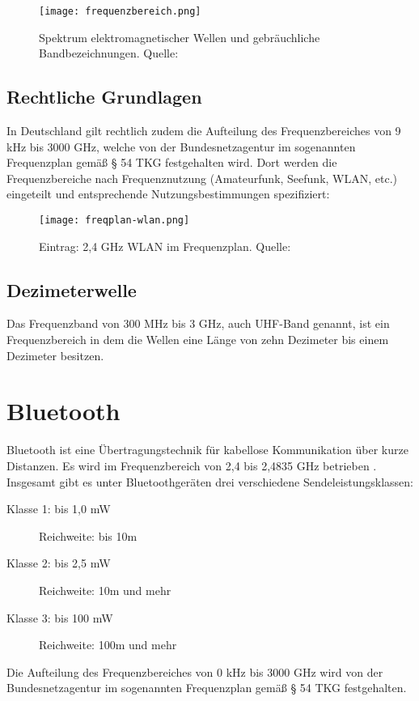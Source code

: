 \begin{figure}[ht]
	\centering
	\texttt{[image: frequenzbereich.png]}
	\caption[Spektrum elektromagnetischer Wellen und gebräuchliche Bandbezeichnungen]{Spektrum elektromagnetischer Wellen und gebräuchliche Bandbezeichnungen. Quelle: \cite[Kark, S. 1]{Kark:2017}} 
	\label{frequenzbereiche}
\end{figure}


\subsection{Rechtliche Grundlagen} %
In Deutschland gilt rechtlich zudem die Aufteilung des Frequenzbereiches von 9 kHz bis 3000 GHz, welche von der Bundesnetzagentur im sogenannten Frequenzplan \cite[Bundesnetzagentur, 2016]{bundesnetzagentur-frequenzplan:2016} gemäß § 54 TKG festgehalten wird.
Dort werden die Frequenzbereiche nach Frequenznutzung (Amateurfunk, Seefunk, WLAN, etc.) eingeteilt und entsprechende Nutzungsbestimmungen spezifiziert:

\begin{figure}[ht]
	\centering
	\texttt{[image: freqplan-wlan.png]}
	\caption[Eintrag: 2,4 GHz WLAN im Frequenzplan]{Eintrag: 2,4 GHz WLAN im Frequenzplan. Quelle: \cite[Bundesnetzagentur, 2016]{bundesnetzagentur-frequenzplan:2016}}
	\label{frequenzplan-wlan}
\end{figure}

\subsection{Dezimeterwelle}
Das Frequenzband von 300 MHz bis 3 GHz, auch \ac{UHF}-Band genannt, ist ein Frequenzbereich in dem die Wellen eine Länge von zehn Dezimeter bis einem Dezimeter besitzen.

\section{Bluetooth}
Bluetooth ist eine Übertragungstechnik für kabellose Kommunikation über kurze Distanzen. Es wird im Frequenzbereich von 2,4 bis 2,4835 GHz betrieben \cite[Bundesamt für Strahlenschutz, S. 1]{bundesamt-strahlungsschutz:2012}. Insgesamt gibt es unter Bluetoothgeräten drei verschiedene Sendeleistungsklassen:
\begin{description}
	\item[Klasse 1: bis 1,0 mW] Reichweite: bis 10m 
	\item [Klasse 2: bis 2,5 mW] Reichweite: 10m und mehr
	\item [Klasse 3: bis 100 mW] Reichweite: 100m und mehr
\end{description}
Die Aufteilung des Frequenzbereiches von 0 kHz bis 3000 GHz wird von der Bundesnetzagentur im sogenannten Frequenzplan \cite[Bundesnetzagentur]{bundesnetzagentur-frequenzplan:2016} gemäß § 54 TKG festgehalten.

